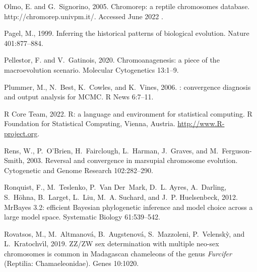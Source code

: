 \documentclass[a4paper, 12pt]{article}
\begin{document}
\begin{thebibliography}{73}
Olmo, E. and G.~Signorino, 2005.
\newblock Chromorep: a reptile chromosomes database.
  http://chromorep.univpm.it/. {A}ccessed {J}une 2022 .

Pagel, M., 1999.
\newblock Inferring the historical patterns of biological evolution.
\newblock Nature 401:877--884.

Pellestor, F. and V.~Gatinois, 2020.
\newblock Chromoanagenesis: a piece of the macroevolution scenario.
\newblock Molecular Cytogenetics 13:1--9.

Plummer, M., N.~Best, K.~Cowles, and K.~Vines, 2006.
: convergence diagnosis and output analysis for {MCMC}.
\newblock R News 6:7--11.

{R Core Team}, 2022.
\newblock R: a language and environment for statistical computing.
\newblock R Foundation for Statistical Computing, Vienna, Austria.
\newblock \urlprefix\url{http://www.R-project.org}.

Rens, W., P.~O'Brien, H.~Fairclough, L.~Harman, J.~Graves, and
  M.~Ferguson-Smith, 2003.
\newblock Reversal and convergence in marsupial chromosome evolution.
\newblock Cytogenetic and Genome Research 102:282--290.

Ronquist, F., M.~Teslenko, P.~Van Der~Mark, D.~L. Ayres, A.~Darling,
  S.~H{\"o}hna, B.~Larget, L.~Liu, M.~A. Suchard, and J.~P. Huelsenbeck, 2012.
\newblock Mr{B}ayes 3.2: efficient {B}ayesian phylogenetic inference and model
  choice across a large model space.
\newblock Systematic Biology 61:539--542.

Rovatsos, M., M.~Altmanov{\'a}, B.~Augstenov{\'a}, S.~Mazzoleni,
  P.~Velensk{\`y}, and L.~Kratochv{\'\i}l, 2019.
\newblock Z{Z}/{ZW} sex determination with multiple neo-sex chromosomes is
  common in {M}adagascan chameleons of the genus \textit{{F}urcifer}
  ({R}eptilia: {C}hamaeleonidae).
\newblock Genes 10:1020.


\end{thebibliography}
\end{document}
